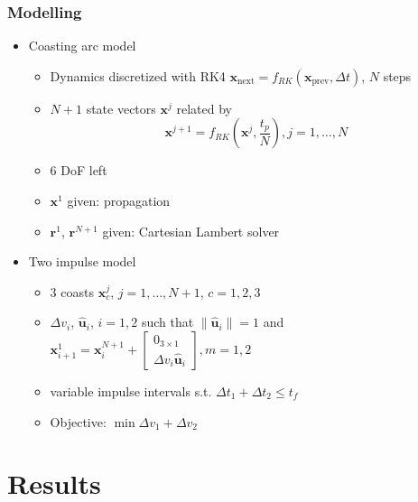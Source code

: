 \documentclass[handout]{beamer}
\begin{document}
\begin{frame}
    \frametitle{Modelling}

    \begin{itemize}\pause
        \item Coasting arc model\pause
        \begin{itemize}
            \item Dynamics discretized with RK4 \(\mathbf{x}_{\text{next}} = f_{RK}(\mathbf{x}_{\text{prev}}, \Delta t)\), \(N\) steps\pause
            \item \(N+1\) state vectors \(\mathbf{x}^j\) related by
            \begin{equation}
                 \mathbf{x}^{j+1} = f_{RK}(\mathbf{x}^j, \frac{t_p}{N}), j = 1, \dots, N
            \end{equation}\pause
            \item 6 DoF left\pause
            \item \(\mathbf{x}^1\) given: propagation\pause
            \item \(\mathbf{r}^1\), \(\mathbf{r}^{N+1}\) given: Cartesian Lambert solver\pause
        \end{itemize}
        \item Two impulse model\pause
        \begin{itemize}
            \item 3 coasts \(\mathbf{x}^j_c\), \(j=1,\dots,N+1\), \(c=1,2,3\)\pause
            \item \(\Delta v_i\), \(\hat{\mathbf{u}}_i\), \(i = 1, 2\) such that \(\lVert \hat{\mathbf{u}}_i \rVert = 1\) and \(\mathbf{x}_{i+1}^1 = \mathbf{x}_i^{N+1} + \begin{bmatrix}
                0_{3\times1} \\ \Delta v_i \hat{\mathbf{u}}_i
            \end{bmatrix}, m=1, 2\)\pause
            \item variable impulse intervals s.t. \(\Delta t_1 + \Delta t_2 \leq t_f\)\pause
            \item Objective: \(\min \Delta v_1 + \Delta v_2\)
        \end{itemize}
    \end{itemize}
\end{frame}

\section{Results}
\end{document}

